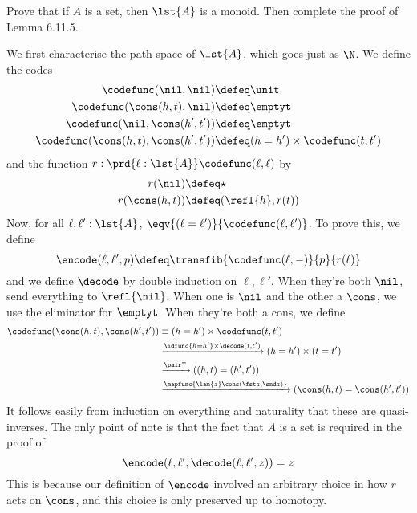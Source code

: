 Prove that if $A$ is a set, then $\lst{A}$ is a monoid.  Then complete the
proof of Lemma 6.11.5.


 \soln
We first characterise the path space of $\lst{A}$, which goes just as $\N$.
We define the codes
\begin{align*}
    \codefunc(\nil, \nil) &\defeq \unit \\
    \codefunc(\cons(h, t), \nil) &\defeq \emptyt \\
    \codefunc(\nil, \cons(h', t')) &\defeq \emptyt \\
    \codefunc(\cons(h, t), \cons(h', t')) &\defeq (h=h') \times \codefunc(t, t')
\end{align*}
and the function $r : \prd{\ell : \lst{A}} \codefunc(\ell, \ell)$ by
\begin{align*}
        r(\nil) &\defeq \star \\
        r(\cons(h, t)) &\defeq (\refl{h}, r(t))
\end{align*}
Now, for all $\ell, \ell' : \lst{A}$, $\eqv{(\ell = \ell')}{\codefunc(\ell,
\ell')}$.  To prove this, we define
\[
  \encode(\ell, \ell', p) \defeq \transfib{\codefunc(\ell, -)}{p}{r(\ell)}
\]
and we define $\decode$ by double induction on $\ell, \ell'$.  When they're
both $\nil$, send everything to $\refl{\nil}$.  When one is $\nil$ and the
other a $\cons$, we use the eliminator for $\emptyt$.  When they're both a
cons, we define
\begin{align*}
  \codefunc(\cons(h, t), \cons(h', t'))
  &\equiv
  (h = h') \times \codefunc(t, t') \\
  &\xrightarrow{\idfunc{h=h'} \times \decode(t, t')}
  (h = h') \times (t = t') \\
  &\xrightarrow{\pair^{=}}
  ((h, t) = (h', t')) \\
  &\xrightarrow{\mapfunc{\lam{z}\cons(\fst z, \snd z)}}
  (\cons(h, t) = \cons(h', t'))
\end{align*}
It follows easily from induction on everything and naturality that these are
quasi-inverses.  The only point of note is that the fact that $A$ is a set is
required in the proof of
\[
  \encode(\ell, \ell', \decode(\ell, \ell', z)) = z
\]
This is because our definition of $\encode$ involved an arbitrary choice in
how $r$ acts on $\cons$, and this choice is only preserved up to homotopy.
